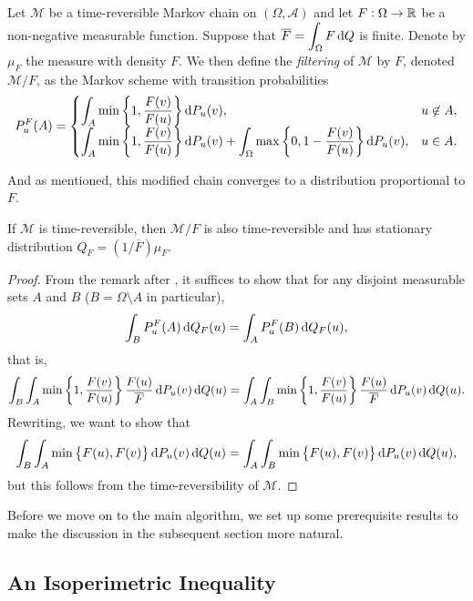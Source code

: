 \begin{fdef}
	\label{def: metropolis chain}
	Let $\mathcal{M}$ be a time-reversible Markov chain on $(\Omega,\mathcal{A})$ and let $F:\Omega\to\mathbb{R}$ be a non-negative measurable function. Suppose that $\overline{F} = \displaystyle\int_\Omega F\operatorname{d}\!{Q}$ is finite. Denote by $\mu_F$ the measure with density $F$. We then define the \textit{filtering} of $\mathcal{M}$ by $F$, denoted $\mathcal{M}/F$, as the Markov scheme with transition probabilities
	\[
		P_u^F(A) = 
		\begin{cases}
			\displaystyle\int_A \min\left\{1,\frac{F(v)}{F(u)}\right\}\operatorname{d}\!{P}_u(v), & u\not\in A, \\
			\displaystyle\int_A \min\left\{1,\frac{F(v)}{F(u)}\right\}\operatorname{d}\!{P}_u(v) + \int_{\Omega} \max\left\{0,1-\frac{F(v)}{F(u)}\right\}\operatorname{d}\!{P}_u(v),  & u\in A.
		\end{cases}
	\]
\end{fdef}

And as mentioned, this modified chain converges to a distribution proportional to $F$.

\begin{theorem}
	If $\mathcal{M}$ is time-reversible, then $\mathcal{M}/F$ is also time-reversible and has stationary distribution $Q_F = (1/\overline{F})\mu_F$.
\end{theorem}
\begin{proof}
	From the remark after , it suffices to show that for any disjoint measurable sets $A$ and $B$ ($B=\Omega\setminus A$ in particular),
	\[ \int_B P_u^F(A)\operatorname{d}\!{Q}_F(u) = \int_A P_u^F(B) \operatorname{d}\!{Q}_F(u), \]
	that is,
	\[ \int_B \int_A \min\left\{1,\frac{F(v)}{F(u)}\right\} \frac{F(u)}{\overline{F}} \operatorname{d}\!{P}_u(v) \operatorname{d}\!{Q}(u) = \int_A \int_B \min\left\{1,\frac{F(v)}{F(u)}\right\} \frac{F(u)}{\overline{F}} \operatorname{d}\!{P}_u(v) \operatorname{d}\!{Q}(u). \]
	Rewriting, we want to show that
	\[ \int_B \int_A \min\left\{F(u),F(v)\right\} \operatorname{d}\!{P}_u(v) \operatorname{d}\!{Q}(u) = \int_A \int_B \min\left\{F(u),F(v)\right\} \operatorname{d}\!{P}_u(v) \operatorname{d}\!{Q}(u), \]
	but this follows from the time-reversibility of $\mathcal{M}$.
\end{proof}

Before we move on to the main algorithm, we set up some prerequisite results to make the discussion in the subsequent section more natural.


\subsection{An Isoperimetric Inequality}

